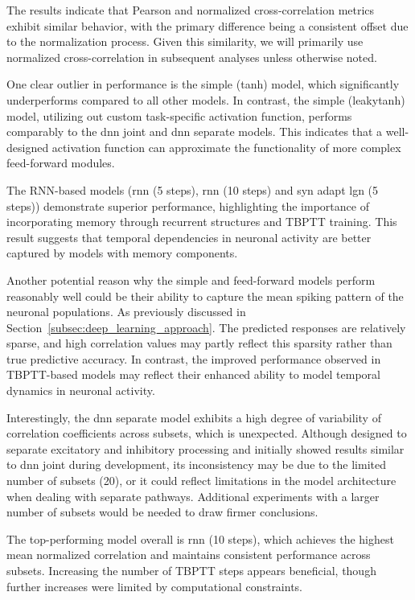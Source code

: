 The results indicate that Pearson and normalized cross-correlation metrics exhibit similar behavior, with the primary difference being a consistent offset due to the normalization process. Given this similarity, we will primarily use normalized cross-correlation in subsequent analyses unless otherwise noted.

One clear outlier in performance is the simple (tanh) model, which significantly underperforms compared to all other models. In contrast, the simple (leakytanh) model, utilizing out custom task-specific activation function, performs comparably to the dnn joint and dnn separate models. This indicates that a well-designed activation function can approximate the functionality of more complex feed-forward modules.

The RNN-based models (rnn (5 steps), rnn (10 steps) and syn adapt lgn (5 steps)) demonstrate superior performance, highlighting the importance of incorporating memory through recurrent structures and TBPTT training. This result suggests that temporal dependencies in neuronal activity are better captured by models with memory components.

Another potential reason why the simple and feed-forward models perform reasonably well could be their ability to capture the mean spiking pattern of the neuronal populations. As previously discussed in Section~\ref{subsec:deep_learning_approach}. The predicted responses are relatively sparse, and high correlation values may partly reflect this sparsity rather than true predictive accuracy. In contrast, the improved performance observed in TBPTT-based models may reflect their enhanced ability to model temporal dynamics in neuronal activity.

Interestingly, the dnn separate model exhibits a high degree of variability of correlation coefficients across subsets, which is unexpected. Although designed to separate excitatory and inhibitory processing and initially showed results similar to dnn joint during development, its inconsistency may be due to the limited number of subsets (20), or it could reflect limitations in the model architecture when dealing with separate pathways. Additional experiments with a larger number of subsets would be needed to draw firmer conclusions.

The top-performing model overall is rnn (10 steps), which achieves the highest mean normalized correlation and maintains consistent performance across subsets. Increasing the number of TBPTT steps appears beneficial, though further increases were limited by computational constraints.

